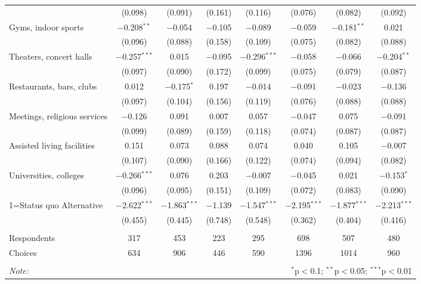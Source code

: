 \begin{table}[!htbp]
\begin{tabular}{@{\extracolsep{5pt}}lccccccc}
  & (0.098) & (0.091) & (0.161) & (0.116) & (0.076) & (0.082) & (0.092) \\ 
  Gyms, indoor sports & $-$0.208$^{**}$ & $-$0.054 & $-$0.105 & $-$0.089 & $-$0.059 & $-$0.181$^{**}$ & 0.021 \\ 
  & (0.096) & (0.088) & (0.158) & (0.109) & (0.075) & (0.082) & (0.088) \\ 
  Theaters, concert halls & $-$0.257$^{***}$ & 0.015 & $-$0.095 & $-$0.296$^{***}$ & $-$0.058 & $-$0.066 & $-$0.204$^{**}$ \\ 
  & (0.097) & (0.090) & (0.172) & (0.099) & (0.075) & (0.079) & (0.087) \\ 
  Restaurants, bars, clubs & 0.012 & $-$0.175$^{*}$ & 0.197 & $-$0.014 & $-$0.091 & $-$0.023 & $-$0.136 \\ 
  & (0.097) & (0.104) & (0.156) & (0.119) & (0.076) & (0.088) & (0.088) \\ 
  Meetings, religious services & $-$0.126 & 0.091 & 0.007 & 0.057 & $-$0.047 & 0.075 & $-$0.091 \\ 
  & (0.099) & (0.089) & (0.159) & (0.118) & (0.074) & (0.087) & (0.087) \\ 
  Assisted living facilities & 0.151 & 0.073 & 0.088 & 0.074 & 0.040 & 0.105 & $-$0.007 \\ 
  & (0.107) & (0.090) & (0.166) & (0.122) & (0.074) & (0.094) & (0.082) \\ 
  Universities, colleges & $-$0.266$^{***}$ & 0.076 & 0.203 & $-$0.007 & $-$0.045 & 0.021 & $-$0.153$^{*}$ \\ 
  & (0.096) & (0.095) & (0.151) & (0.109) & (0.072) & (0.083) & (0.090) \\ 
  1=Status quo Alternative & $-$2.622$^{***}$ & $-$1.863$^{***}$ & $-$1.139 & $-$1.547$^{***}$ & $-$2.195$^{***}$ & $-$1.877$^{***}$ & $-$2.213$^{***}$ \\ 
  & (0.455) & (0.445) & (0.748) & (0.548) & (0.362) & (0.404) & (0.416) \\ 
 \hline \\[-1.8ex] 
Respondents & 317 & 453 & 223 & 295 & 698 & 507 & 480\\ 
 Choices & 634 & 906 & 446 & 590 & 1396 & 1014 & 960\\ 
\hline 
\hline \\[-1.8ex] 
\textit{Note:}  & \multicolumn{7}{r}{$^{*}$p$<$0.1; $^{**}$p$<$0.05; $^{***}$p$<$0.01} \\ 
\end{tabular} 
\end{table} 
